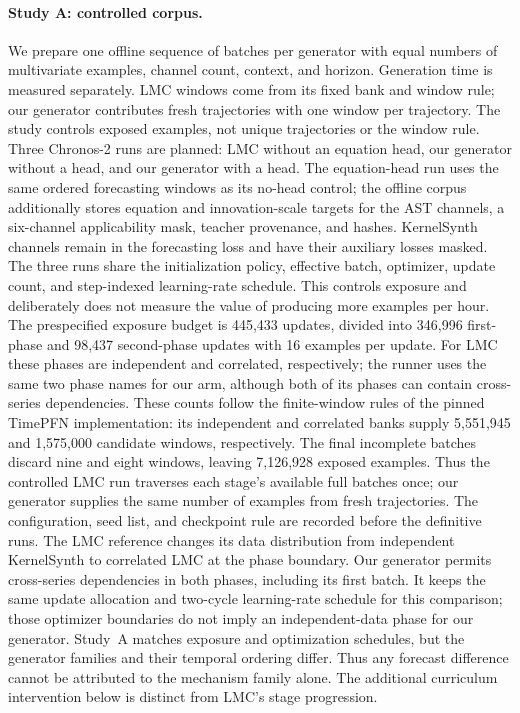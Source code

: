 \paragraph{Study A: controlled corpus.}
We prepare one offline sequence of batches per generator with equal numbers of
multivariate examples, channel count, context, and horizon. Generation time is
measured separately. LMC windows come from its fixed bank and window rule;
our generator contributes fresh trajectories with one window per trajectory.
The study controls exposed examples, not unique trajectories or the window
rule. Three Chronos-2 runs are planned: LMC without an equation head, our
generator without a head, and our generator with a head. The equation-head
run uses the same ordered forecasting windows as its no-head control; the
offline corpus additionally stores equation and innovation-scale targets for
the AST channels, a six-channel applicability mask, teacher provenance, and
hashes. KernelSynth channels remain in the forecasting loss and have their
auxiliary losses masked.
The three runs share
the initialization policy, effective batch, optimizer, update count, and
step-indexed learning-rate schedule. This controls exposure and deliberately
does not measure the value of producing more examples per hour. The
prespecified exposure budget is 445,433 updates, divided into 346,996
first-phase and 98,437 second-phase updates with 16 examples per update. For
LMC these phases are independent and correlated, respectively; the runner
uses the same two phase names for our arm, although both of its phases can
contain cross-series dependencies. These
counts follow the finite-window rules of the pinned TimePFN implementation:
its independent and correlated banks supply 5,551,945 and 1,575,000 candidate
windows, respectively. The final incomplete batches discard nine and eight
windows, leaving 7,126,928 exposed examples. Thus the controlled LMC run
traverses each stage's available full batches once; our generator supplies
the same number of examples from fresh trajectories. The configuration,
seed list, and checkpoint rule are recorded before the definitive runs.
The LMC reference changes its data distribution from independent KernelSynth
to correlated LMC at the phase boundary. Our generator permits cross-series
dependencies in both phases, including its first batch. It keeps the same
update allocation and two-cycle learning-rate schedule for this comparison;
those optimizer boundaries do not imply an independent-data phase for our
generator. Study~A matches exposure and optimization schedules, but the
generator families and their temporal ordering differ. Thus any forecast
difference cannot be attributed to the mechanism family alone. The additional
curriculum intervention below is distinct from LMC's stage progression.

